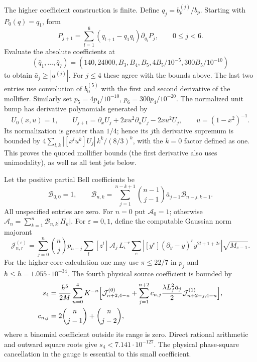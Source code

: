 \documentclass[11pt]{article}
\theoremstyle{definition}\newtheorem{definition}[theorem]{Definition}
\theoremstyle{remark}\newtheorem{remark}[theorem]{Remark}
\begin{document}
The higher coefficient construction is finite. Define $q_j=b_p^{(j)}/b_p$.
Starting with $P_0(q)=q_1$, form
\[
 P_{j+1}=\sum_{l=1}^6(q_{l+1}-q_1q_l)\partial_{q_l}P_j,
 \qquad 0\le j<6.
\]
Evaluate the absolute coefficients at
\[
 (\bar q_1,\ldots,\bar q_7)
 =(140,24000,B_3,B_4,B_5,4B_5/10^{-5},300B_5/10^{-10})
\]
to obtain $\bar a_j\ge|a^{(j)}|$. For $j\le4$ these agree with
the bounds above. The last two entries use convolution of $b_0^{(5)}$
with the first and second derivative of the mollifier. Similarly set
$p_5=4p_4/10^{-10}$, $p_6=300p_4/10^{-20}$.
The normalized unit bump has derivative polynomials generated by
\begin{equation}
 U_0(x,u)=1,\qquad
 U_{j+1}=\partial_xU_j+2xu^2\partial_uU_j-2xu^2U_j,
 \qquad u=(1-x^2)^{-1}. \label{prep:bump-recurrence}
\end{equation}
Its normalization is greater than $1/4$; hence its $j$th derivative
supremum is bounded by
$4\sum_{l,k}|[x^lu^k]U_j|\,k^k/(8/3)^k$, with the $k=0$
factor defined as one. This proves the quoted mollifier bounds (the
first derivative also uses unimodality), as well as all tent jets below.

Let the positive partial Bell coefficients be
\[
 \mathcal B_{0,0}=1,\qquad
 \mathcal B_{n,k}=\sum_{j=1}^{n-k+1}\binom{n-1}{j-1}
                   \bar a_{j-1}\mathcal B_{n-j,k-1}.
\]
All unspecified entries are zero. For $n=0$ put $\mathcal A_0=1$;
otherwise $\mathcal A_n=\sum_{k=1}^n\mathcal B_{n,k}|H_k|$.
For $\varepsilon=0,1$, define the computable Gaussian norm majorant
\[
 \mathcal J_{n,r}^{(\varepsilon)}=
 \sum_{j=0}^n\binom nj p_{n-j}
 \sum_l[z^l]\mathcal A_j\,L_i^{-r}
 \sum_e\left|[y^e](\partial_y-y)^r y^{2l+1+2\varepsilon}\right|
                                   \sqrt{M_{e-1}}.
\]
For the higher-core calculation one may use $\pi\le22/7$ in $p_j$
and $\hbar\le\bar h=1.055\cdot10^{-34}$. The fourth physical source
coefficient is bounded by
\begin{align}
 s_4&=\frac{\bar h^5}{2M}\sum_{n=0}^4K^{-n}\Bigl[
 \mathcal J_{n+2,4-n}^{(0)}
 +\sum_{j=1}^{n+2}c_{n,j}\frac{\lambda L_f^2\bar a_j}{2}
                              \mathcal J_{n+2-j,4-n}^{(1)}\Bigr],\\
 c_{n,j}&=2\binom n{j-1}+\binom n{j-2},
 \label{prep:fourth-core}
\end{align}
where a binomial coefficient outside its range is zero. Direct rational
arithmetic and outward square roots give $s_4<7.141\cdot10^{-127}$.
The physical phase-square cancellation in the gauge is essential to
this small coefficient.
\end{document}
